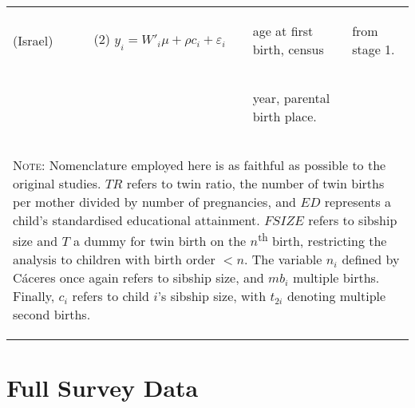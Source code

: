 \documentclass{article}[11pt,subeqn]
\begin{document}
\begin{spacing}{1.5}
\begin{center}
\begin{rotate}{90}
\begin{tabular}{lp{4mm}lll}
\\
(Israel) & &
(2) $y_i=W'_i\mu+\rho c_i + \varepsilon_i$ &  
\begin{small}age at first birth, census \end{small} &
\begin{small}from stage 1.\end{small}
\\
& & &
\begin{small}year, parental birth place.\end{small}&
\\
\bottomrule 
\multicolumn{5}{p{19.2cm}}{\setstretch{0.9}\begin{footnotesize}\textsc{Note:} Nomenclature employed here is as faithful as possible to the original studies.  $TR$ refers to twin ratio, the number of twin births per mother divided by number of pregnancies, and $ED$ represents a child's standardised educational attainment. $FSIZE$ refers to sibship size and $T$ a dummy for twin birth on the $n$\textsuperscript{th} birth, restricting the analysis to children with birth order $<n$. The variable $n_i$ defined by C\'aceres once again refers to sibship size, and $mb_i$ multiple births. Finally, $c_i$ refers to child $i$'s sibship size, with $t_{2i}$ denoting multiple second births.\end{footnotesize}}\\
\end{tabular}
\end{rotate}
\label{tab:litrev}
\end{center}

\section{Full Survey Data}
\label{scn:surveys}



\end{spacing}
\end{document}

